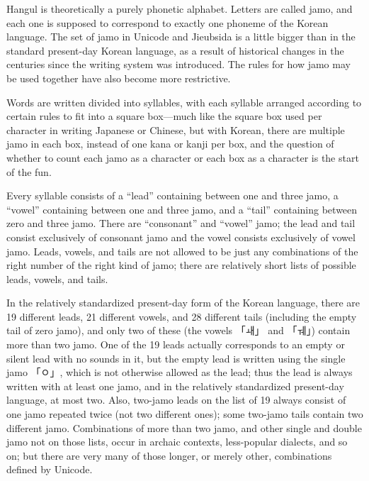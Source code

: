 \documentclass[14pt]{extarticle}
\begin{document}
Hangul is theoretically a purely phonetic alphabet.  Letters are called
jamo, and each one is supposed to correspond to exactly one phoneme of the
Korean language.  The set of jamo in Unicode and Jieubsida is a little
bigger than in the standard present-day Korean language, as a result of
historical changes in the centuries since the writing system was introduced. 
The rules for how jamo may be used together have also become more
restrictive.

Words are written divided into syllables, with each syllable arranged
according to certain rules to fit into a square box---much like the square
box used per character in writing Japanese or Chinese, but with Korean,
there are multiple jamo in each box, instead of one kana or kanji per box,
and the question of whether to count each jamo as a character or each box as
a character is the start of the fun.

Every syllable consists of a ``lead'' containing between one and three jamo,
a ``vowel'' containing between one and three jamo, and a ``tail'' containing
between zero and three jamo.  There are ``consonant'' and ``vowel'' jamo;
the lead and tail consist exclusively of consonant jamo and the vowel
consists exclusively of vowel jamo.  Leads, vowels, and tails are not
allowed to be just any combinations of the right number of the right kind of
jamo; there are relatively short lists of possible leads, vowels, and tails. 

In the relatively standardized present-day form of the Korean language,
there are 19 different leads, 21 different vowels, and 28 different tails
(including the empty tail of zero jamo), and only two of these (the vowels
{\dodum 「ㅙ」} and {\dodum 「ㅞ」}) contain more than two jamo.  One of the
19 leads actually corresponds to an empty or silent lead with no sounds in
it, but the empty lead is written using the single jamo {\dodum 「ㅇ」},
which is not otherwise allowed as the lead; thus
the lead is always written with at least one jamo, and in the relatively
standardized present-day language, at most two.  Also, two-jamo leads on the
list of 19 always consist of one jamo repeated twice (not two different
ones); some two-jamo tails contain two different jamo.  Combinations of more
than two jamo, and other single and double jamo not on those lists, occur in
archaic contexts, less-popular dialects, and so on; but there are very many
of those longer, or merely other, combinations defined by Unicode.

\end{document}
